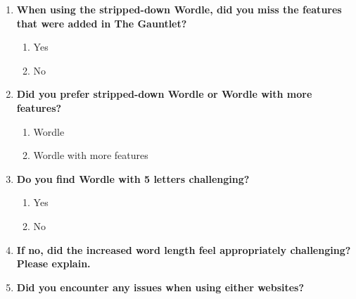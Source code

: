 \begin{enumerate}
    \item \textbf{When using the stripped-down Wordle, did you miss the features that were added in The Gauntlet?}
    \begin{enumerate}[label=(\arabic*)]
        \item Yes
        \item No
    \end{enumerate}

    \item \textbf{Did you prefer stripped-down Wordle or Wordle with more features?}
    \begin{enumerate}[label=(\arabic*)]
        \item Wordle
        \item Wordle with more features
    \end{enumerate}

    \item \textbf{Do you find Wordle with 5 letters challenging?}
    \begin{enumerate}[label=(\arabic*)]
        \item Yes
        \item No
    \end{enumerate}

    \item \textbf{If no, did the increased word length feel appropriately challenging? Please explain.}
    \vspace{2cm}
    \hrulefill

    \item \textbf{Did you encounter any issues when using either websites?}
    \vspace{2cm}
    \hrulefill

\end{enumerate}

